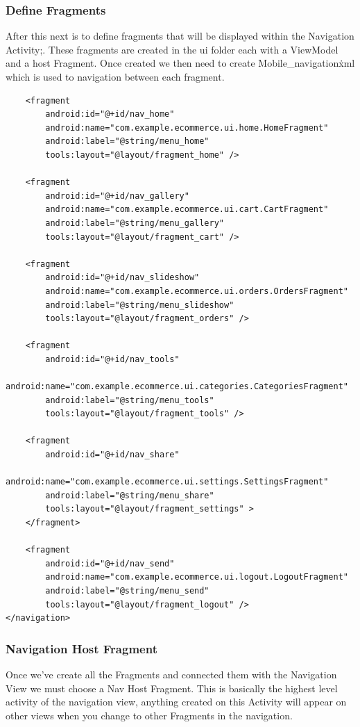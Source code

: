 \subsubsection{Define Fragments}
After this next is to define fragments that will be displayed within the Navigation Activity;.
These fragments are created in the ui folder each with a View\-Model and a host Fragment.
Once created we then need to create Mobile\_navigation\.xml which is used to navigation between each fragment.
\begin{verbatim}
    <fragment
        android:id="@+id/nav_home"
        android:name="com.example.ecommerce.ui.home.HomeFragment"
        android:label="@string/menu_home"
        tools:layout="@layout/fragment_home" />

    <fragment
        android:id="@+id/nav_gallery"
        android:name="com.example.ecommerce.ui.cart.CartFragment"
        android:label="@string/menu_gallery"
        tools:layout="@layout/fragment_cart" />

    <fragment
        android:id="@+id/nav_slideshow"
        android:name="com.example.ecommerce.ui.orders.OrdersFragment"
        android:label="@string/menu_slideshow"
        tools:layout="@layout/fragment_orders" />

    <fragment
        android:id="@+id/nav_tools"
        android:name="com.example.ecommerce.ui.categories.CategoriesFragment"
        android:label="@string/menu_tools"
        tools:layout="@layout/fragment_tools" />

    <fragment
        android:id="@+id/nav_share"
        android:name="com.example.ecommerce.ui.settings.SettingsFragment"
        android:label="@string/menu_share"
        tools:layout="@layout/fragment_settings" >
    </fragment>

    <fragment
        android:id="@+id/nav_send"
        android:name="com.example.ecommerce.ui.logout.LogoutFragment"
        android:label="@string/menu_send"
        tools:layout="@layout/fragment_logout" />
</navigation>
\end{verbatim}

\subsubsection{Navigation Host Fragment}
Once we've create all the Fragments and connected them with the Navigation View we must choose a Nav Host Fragment. This is basically the highest level activity of the navigation view, anything created on this Activity will appear on other views when you change to other Fragments in the navigation. 

